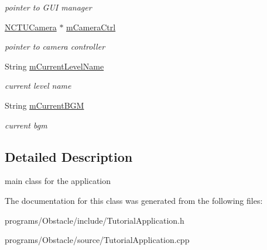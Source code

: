 \begin{DoxyCompactItemize}
\begin{DoxyCompactList}\small\item\em pointer to G\+UI manager \end{DoxyCompactList}\item 
\hyperlink{class_n_c_t_u_camera}{N\+C\+T\+U\+Camera} $\ast$ \hyperlink{class_basic_tutorial__00_a06bc4644751657e95cf03f6554257658}{m\+Camera\+Ctrl}\hypertarget{class_basic_tutorial__00_a06bc4644751657e95cf03f6554257658}{}\label{class_basic_tutorial__00_a06bc4644751657e95cf03f6554257658}

\begin{DoxyCompactList}\small\item\em pointer to camera controller \end{DoxyCompactList}\item 
String \hyperlink{class_basic_tutorial__00_aa2fcff6c794db576838456e6b8626524}{m\+Current\+Level\+Name}\hypertarget{class_basic_tutorial__00_aa2fcff6c794db576838456e6b8626524}{}\label{class_basic_tutorial__00_aa2fcff6c794db576838456e6b8626524}

\begin{DoxyCompactList}\small\item\em current level name \end{DoxyCompactList}\item 
String \hyperlink{class_basic_tutorial__00_ab0503757c829a4a80e7d235840a43e7b}{m\+Current\+B\+GM}\hypertarget{class_basic_tutorial__00_ab0503757c829a4a80e7d235840a43e7b}{}\label{class_basic_tutorial__00_ab0503757c829a4a80e7d235840a43e7b}

\begin{DoxyCompactList}\small\item\em current bgm \end{DoxyCompactList}\end{DoxyCompactItemize}


\subsection{Detailed Description}
main class for the application 

The documentation for this class was generated from the following files\+:\begin{DoxyCompactItemize}
\item 
programs/\+Obstacle/include/Tutorial\+Application.\+h\item 
programs/\+Obstacle/source/Tutorial\+Application.\+cpp\end{DoxyCompactItemize}
